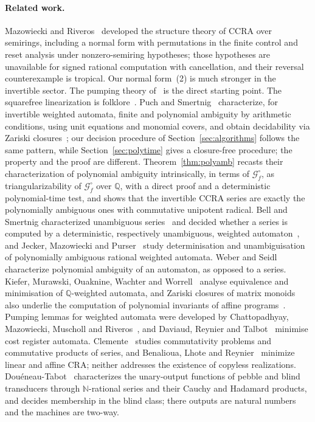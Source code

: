 \documentclass[acmlarge,screen,11pt,nonacm,natbib=false]{acmart}
\newcommand{\Q}{\mathbb{Q}}
\newcommand{\N}{\mathbb{N}}
\newcommand{\cG}{\mathcal{G}}
\theoremstyle{definition}
\begin{document}
\paragraph{Related work.}
Mazowiecki and Riveros~\cite{MR16,MR19} developed the structure theory of CCRA over semirings, including a normal form with permutations in the finite control and reset analysis under nonzero-semiring hypotheses; those hypotheses are unavailable for signed rational computation with cancellation, and their reversal counterexample is tropical. Our normal form~(2) is much stronger in the invertible sector. The pumping theory of~\cite{MPS26} is the direct starting point. The squarefree linearization is folklore~\cite[Lemma~50]{MPSfull}. Puch and Smertnig~\cite{PS24} characterize, for invertible weighted automata, finite and polynomial ambiguity by arithmetic conditions, using unit equations and monomial covers, and obtain decidability via Zariski closures~\cite{DJK05,NPSSW22}; our decision procedure of Section~\ref{sec:algorithms} follows the same pattern, while Section~\ref{sec:polytime} gives a closure-free procedure; the property and the proof are different. Theorem~\ref{thm:polyamb} recasts their characterization of polynomial ambiguity intrinsically, in terms of $\cG_f^\circ$, as triangularizability of $\cG_f^\circ$ over $\Q$, with a direct proof and a deterministic polynomial-time test, and shows that the invertible CCRA series are exactly the polynomially ambiguous ones with commutative unipotent radical. Bell and Smertnig characterized unambiguous series~\cite{BS21} and decided whether a series is computed by a deterministic, respectively unambiguous, weighted automaton~\cite{BS23}, and Jecker, Mazowiecki and Purser~\cite{JMP24} study determinisation and unambiguisation of polynomially ambiguous rational weighted automata. Weber and Seidl~\cite{WS91} characterize polynomial ambiguity of an automaton, as opposed to a series. Kiefer, Murawski, Ouaknine, Wachter and Worrell~\cite{KMOWW13} analyse equivalence and minimisation of $\Q$-weighted automata, and Zariski closures of matrix monoids also underlie the computation of polynomial invariants of affine programs~\cite{HOPW18}. Pumping lemmas for weighted automata were developed by Chattopadhyay, Mazowiecki, Muscholl and Riveros~\cite{CMMR21}, and Daviaud, Reynier and Talbot~\cite{DRT16} minimise cost register automata. Clemente~\cite{C25,C26} studies commutativity problems and commutative products of series, and Benalioua, Lhote and Reynier~\cite{BLR24} minimize linear and affine CRA; neither addresses the existence of copyless realizations. Douéneau-Tabot~\cite{DT22} characterizes the unary-output functions of pebble and blind transducers through $\N$-rational series and their Cauchy and Hadamard products, and decides membership in the blind class; there outputs are natural numbers and the machines are two-way.
\end{document}
